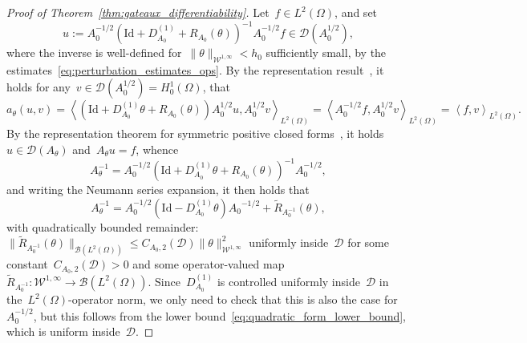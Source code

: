 \documentclass[a4]{article}
\newcommand{\cD}{\mathcal{D}}
\newcommand{\1}{\mathbbm 1}
\newcommand{\Winf}{{{\cW}^{1,\infty}}}
\newcommand{\Id}{\mathrm{Id}}
\newcommand{\cW}{\mathcal{W}}
\begin{document}
\begin{proof}[Proof of Theorem~\ref{thm:gateaux_differentiability}]
    Let~$f\in L^2(\Omega)$, and set
    \begin{equation}
        \label{eq:inv_A_ansatz}
        u := A_0^{-1/2}(\Id+D_{A_0}^{(1)}+R_{A_0}(\theta))^{-1}A_0^{-1/2}f\in \mathcal D(A_0^{1/2}),
    \end{equation}
    where the inverse is well-defined for~$\|\theta\|_{\Winf}<h_0$ sufficiently small, by the estimates~\eqref{eq:perturbation_estimates_ops}.
    By the representation result~\cite[Theorem VI.3.1]{K13}, it holds for any~$v\in\cD(A_0^{1/2})=H_0^1(\Omega)$, that
    \begin{equation}
        a_\theta(u,v) = \left\langle (\Id + D_{A_0}^{(1)}\theta + R_{A_0}(\theta))A_0^{1/2}u,A_0^{1/2}v\right\rangle_{L^2(\Omega)} = \left\langle A_0^{-1/2}f,A_0^{1/2}v\right\rangle_{L^2(\Omega)} = \left\langle f,v\right\rangle_{L^2(\Omega)}.
    \end{equation}
    By the representation theorem for symmetric positive closed forms~\cite[Theorem VI.2.1]{K13}, it holds~$u\in\cD(A_\theta)$ and~$A_\theta u = f$, whence
    \begin{equation}
        A_\theta^{-1} = A_0^{-1/2}\left(\Id + D_{A_0}^{(1)}\theta+R_{A_0}(\theta)\right)^{-1}A_0^{-1/2},
    \end{equation}
    and writing the Neumann series expansion, it then holds that
    \begin{equation}
        A_\theta^{-1} = A_0^{-1/2}\left(\Id-D_{A_0}^{(1)}\theta\right){A_0}^{-1/2} + \widetilde{R}_{A_0^{-1}}(\theta),
    \end{equation}
    with quadratically bounded remainder:~$\|\widetilde{R}_{A_{0}^{-1}}(\theta)\|_{\mathcal B(L^2(\Omega))} \leq C_{A_0,2}(\mathcal D) \|\theta\|_{\Winf}^2$ uniformly inside~$\mathcal D$ for some constant~$C_{A_0,2}(\mathcal D)>0$ and some operator-valued map~$\widetilde{R}_{A_0^{-1}}:\Winf\to\mathcal B(L^2(\Omega))$.
    Since~$D_{A_0}^{(1)}$ is controlled uniformly inside~$\mathcal D$ in the~$L^2(\Omega)$-operator norm, we only need to check that this is also the case for~$A_0^{-1/2}$, but this follows from the lower bound~\eqref{eq:quadratic_form_lower_bound}, which is uniform inside~$\mathcal D$.


\end{proof}
\end{document}
